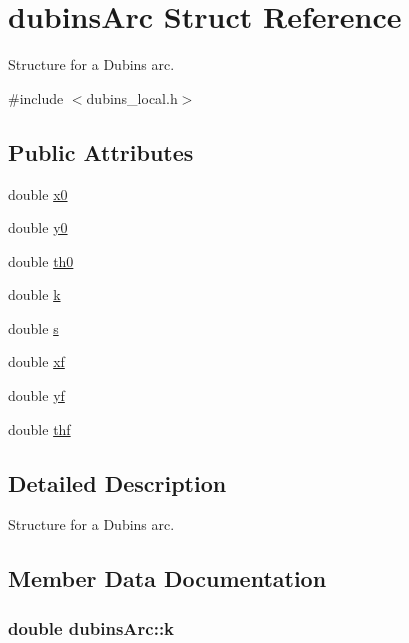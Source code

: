 \hypertarget{structdubinsArc}{}\section{dubins\+Arc Struct Reference}
\label{structdubinsArc}


Structure for a Dubins arc.  




{\ttfamily \#include $<$dubins\+\_\+local.\+h$>$}

\subsection*{Public Attributes}
\begin{DoxyCompactItemize}
\item 
double \hyperlink{structdubinsArc_a120eba56ab37025c4de0835b90a3faf2}{x0}
\item 
double \hyperlink{structdubinsArc_ae05a57a66703e9993a68c23160a7b54a}{y0}
\item 
double \hyperlink{structdubinsArc_a51bb953226e122a68b132cd4c7d4a198}{th0}
\item 
double \hyperlink{structdubinsArc_ae3556ac95899f6a96dcb728a864c74b3}{k}
\item 
double \hyperlink{structdubinsArc_a5fe3bc6759fc84ee91d254c84015d34d}{s}
\item 
double \hyperlink{structdubinsArc_a5bad303217c1f05eb0feb97d9b636528}{xf}
\item 
double \hyperlink{structdubinsArc_a782cb717a7d9ab1836d3fae17073f104}{yf}
\item 
double \hyperlink{structdubinsArc_aca32bb174d947ee2e38fc00dda92bc63}{thf}
\end{DoxyCompactItemize}


\subsection{Detailed Description}
Structure for a Dubins arc. 

\subsection{Member Data Documentation}
\subsubsection[{\texorpdfstring{k}{k}}]{\setlength{\rightskip}{0pt plus 5cm}double dubins\+Arc\+::k}\hypertarget{structdubinsArc_ae3556ac95899f6a96dcb728a864c74b3}{}\label{structdubinsArc_ae3556ac95899f6a96dcb728a864c74b3}

